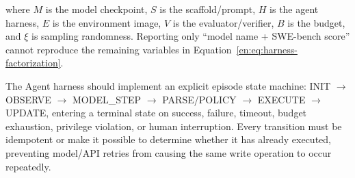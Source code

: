 \documentclass[10pt,a4paper,UTF8,fontset=none]{ctexart}
\newcommand{\ident}[1]{{\rmfamily #1}}
\begin{document}
where $M$ is the model checkpoint, $S$ is the scaffold/prompt, $H$ is the agent harness, $E$ is the environment image, $V$ is the evaluator/verifier, $B$ is the budget, and $\xi$ is sampling randomness. Reporting only ``model name + SWE-bench score'' cannot reproduce the remaining variables in Equation~\eqref{en:eq:harness-factorization}.

The Agent harness should implement an explicit episode state machine: \ident{INIT} $\rightarrow$ \ident{OBSERVE} $\rightarrow$ \ident{MODEL\_STEP} $\rightarrow$ \ident{PARSE/POLICY} $\rightarrow$ \ident{EXECUTE} $\rightarrow$ \ident{UPDATE}, entering a terminal state on success, failure, timeout, budget exhaustion, privilege violation, or human interruption. Every transition must be idempotent or make it possible to determine whether it has already executed, preventing model/API retries from causing the same write operation to occur repeatedly.
\end{document}
